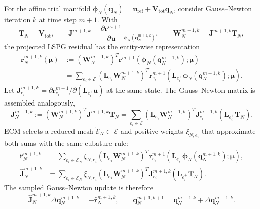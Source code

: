 \documentclass[11pt]{article}
\begin{document}
For the affine trial manifold
$\boldsymbol\phi_N(\mathbf q_N)=\mathbf u_{\mathrm{ref}}+\mathbf V_{\mathrm{tot}}\mathbf q_N$,
consider Gauss--Newton iteration $k$ at time step $m+1$.  With
\begin{equation}
\mathbf T_N=\mathbf V_{\mathrm{tot}},
\qquad
\mathbf J^{m+1,k}=\frac{\partial\mathbf r^{m+1}}{\partial\mathbf u}
\bigg|_{\boldsymbol\phi_N(\mathbf q_N^{m+1,k})},
\qquad
\mathbf W_N^{m+1,k}=\mathbf J^{m+1,k}\mathbf T_N,
\label{eq:linear-hprom-test-basis}
\end{equation}
the projected LSPG residual has the entity-wise representation
\begin{equation}
\begin{aligned}
\mathbf r_N^{m+1,k}(\bm\mu)
&:=(\mathbf W_N^{m+1,k})^{T}\mathbf r^{m+1}
\!\left(\boldsymbol\phi_N(\mathbf q_N^{m+1,k});\bm\mu\right) \\
&=
\sum_{e_i\in\mathcal E}
\left(\mathbf L_{e_i}\mathbf W_N^{m+1,k}\right)^T
\mathbf r_{e_i}^{m+1}
\!\left(\mathbf L_{e_i^+}\boldsymbol\phi_N(\mathbf q_N^{m+1,k});\bm\mu\right).
\end{aligned}
\label{eq:linear-projected-residual}
\end{equation}
Let
$\mathbf J_{e_i}^{m+1,k}=\partial\mathbf r_{e_i}^{m+1}/\partial(\mathbf L_{e_i^+}\mathbf u)$
at the same state. The Gauss--Newton matrix is assembled analogously,
\begin{equation}
\mathbf J_N^{m+1,k}
:=
(\mathbf W_N^{m+1,k})^T\mathbf J^{m+1,k}\mathbf T_N
=
\sum_{e_i\in\mathcal E}
\left(\mathbf L_{e_i}\mathbf W_N^{m+1,k}\right)^T
\mathbf J_{e_i}^{m+1,k}
\left(\mathbf L_{e_i^+}\mathbf T_N\right).
\label{eq:linear-projected-jacobian}
\end{equation}
ECM selects a reduced mesh $\widetilde{\mathcal E}_N\subset\mathcal E$ and
positive weights $\xi_{N,e_i}$ that approximate both sums with the same
cubature rule:
\begin{equation}
\begin{aligned}
\widehat{\mathbf r}_N^{m+1,k}
&=
\sum_{e_i\in\widetilde{\mathcal E}_N}\xi_{N,e_i}
\left(\mathbf L_{e_i}\mathbf W_N^{m+1,k}\right)^T
\mathbf r_{e_i}^{m+1}
\!\left(\mathbf L_{e_i^+}\boldsymbol\phi_N(\mathbf q_N^{m+1,k});\bm\mu\right),\\
\widehat{\mathbf J}_N^{m+1,k}
&=
\sum_{e_i\in\widetilde{\mathcal E}_N}\xi_{N,e_i}
\left(\mathbf L_{e_i}\mathbf W_N^{m+1,k}\right)^T
\mathbf J_{e_i}^{m+1,k}
\left(\mathbf L_{e_i^+}\mathbf T_N\right).
\end{aligned}
\label{eq:linear-ecm-sampled-normal-equations}
\end{equation}
The sampled Gauss--Newton update is therefore
\begin{equation}
\widehat{\mathbf J}_N^{m+1,k}\Delta\mathbf q_N^{m+1,k}
=-\widehat{\mathbf r}_N^{m+1,k},
\qquad
\mathbf q_N^{m+1,k+1}
=\mathbf q_N^{m+1,k}+\Delta\mathbf q_N^{m+1,k}.
\label{eq:linear-hprom-gn-update}
\end{equation}
\end{document}
